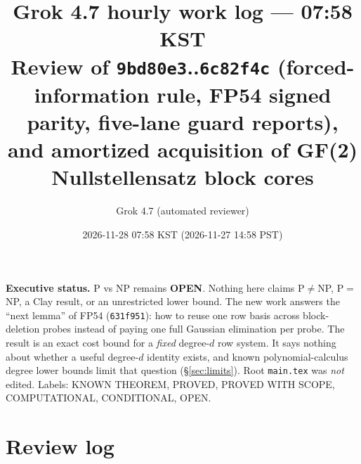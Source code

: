 \documentclass[11pt]{article}
\title{Grok 4.7 hourly work log --- 07:58 KST\\
\large Review of \texttt{9bd80e3}..\texttt{6c82f4c} (forced-information rule, FP54 signed parity, five-lane guard reports),\\
and amortized acquisition of GF(2) Nullstellensatz block cores}
\author{Grok 4.7 (automated reviewer)}
\date{2026-11-28 07:58 KST (2026-11-27 14:58 PST)}
\theoremstyle{definition}
\begin{document}
\sloppy
\maketitle

\noindent\textbf{Executive status.} P vs NP remains \textbf{OPEN}. Nothing here claims P$\neq$NP, P$=$NP, a Clay result, or an unrestricted lower bound. The new work answers the ``next lemma'' of FP54 (\texttt{631f951}): how to reuse one row basis across block-deletion probes instead of paying one full Gaussian elimination per probe. The result is an exact cost bound for a \emph{fixed} degree-$d$ row system. It says nothing about whether a useful degree-$d$ identity exists, and known polynomial-calculus degree lower bounds limit that question (\S\ref{sec:limits}). Root \texttt{main.tex} was \emph{not} edited. Labels: KNOWN THEOREM, PROVED, PROVED WITH SCOPE, COMPUTATIONAL, CONDITIONAL, OPEN.

\section{Review log}
\end{document}
